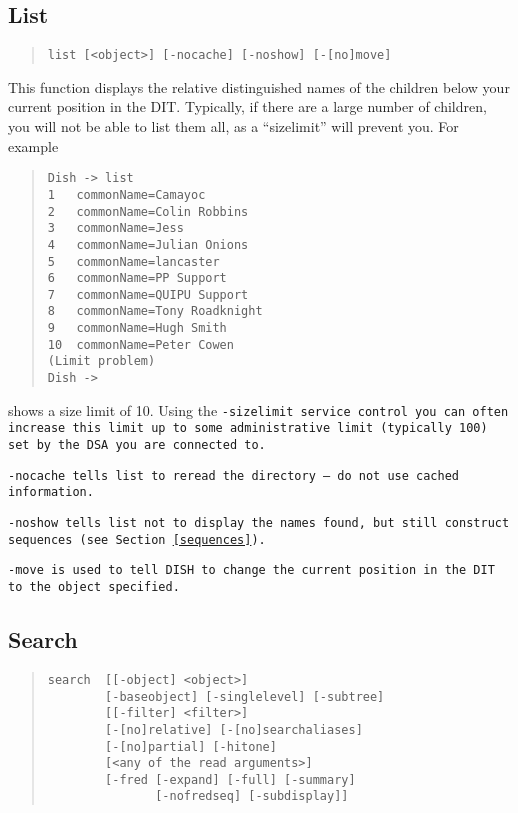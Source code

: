 \subsection{List}
\label{dua:list}
\begin{quote}\begin{verbatim}
list [<object>] [-nocache] [-noshow] [-[no]move]
\end{verbatim}\end{quote}
This function displays the relative distinguished names of 
the children below your current position in the DIT.
Typically, if there are a large number of children, 
you will not be able to list them all, as a ``sizelimit'' will prevent you.
For example
\begin{quote}\small\begin{verbatim}
Dish -> list
1   commonName=Camayoc
2   commonName=Colin Robbins
3   commonName=Jess
4   commonName=Julian Onions
5   commonName=lancaster
6   commonName=PP Support
7   commonName=QUIPU Support
8   commonName=Tony Roadknight
9   commonName=Hugh Smith
10  commonName=Peter Cowen
(Limit problem)
Dish ->
\end{verbatim}\end{quote}
shows a size limit of 10.
Using the \tt -sizelimit\rm \ service control you can often increase this limit
up to some administrative limit (typically 100) set by the 
DSA you are connected to.

\tt -nocache\rm \ tells list to reread the directory --- do not use cached information.

\tt -noshow\rm \ tells list not to display the names found, but 
still construct sequences (see Section~\ref{sequences}).

\tt -move\rm \ is used to tell DISH to change the current position in the DIT
to the object specified. 

\subsection{Search}
\label{search}

\begin{quote}\begin{verbatim}
search  [[-object] <object>] 
        [-baseobject] [-singlelevel] [-subtree]
        [[-filter] <filter>] 
        [-[no]relative] [-[no]searchaliases]
        [-[no]partial] [-hitone]
        [<any of the read arguments>]
        [-fred [-expand] [-full] [-summary] 
               [-nofredseq] [-subdisplay]]
\end{verbatim}\end{quote}

